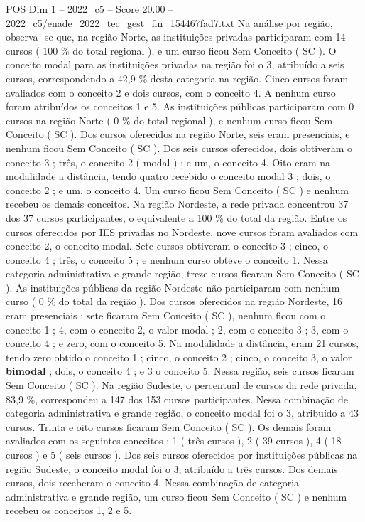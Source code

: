 \begin{textsample}{POS Dim 1 – 2022\_c5 – Score 20.00 – 2022\_c5/enade\_2022\_tec\_gest\_fin\_154467fad7.txt}
Na análise por região, observa -se que, na região Norte, as instituições privadas participaram com 14 cursos ( 100 \% do total regional ), e um curso ficou Sem Conceito ( SC ).
O conceito modal para as instituições privadas na região foi o 3, atribuído a seis cursos, correspondendo a 42,9 \% desta categoria na região.
Cinco cursos foram avaliados com o conceito 2 e dois cursos, com o conceito 4.
A nenhum curso foram atribuídos os conceitos 1 e 5.
As instituições públicas participaram com 0 cursos na região Norte ( 0 \% do total regional ), e nenhum curso ficou Sem Conceito ( SC ).
Dos cursos oferecidos na região Norte, seis eram presenciais, e nenhum ficou Sem Conceito ( SC ).
Dos seis cursos oferecidos, dois obtiveram o conceito 3 ; três, o conceito 2 ( modal ) ; e um, o conceito 4.
Oito eram na modalidade a distância, tendo quatro recebido o conceito modal 3 ; dois, o conceito 2 ; e um, o conceito 4.
Um curso ficou Sem Conceito ( SC ) e nenhum recebeu os demais conceitos.
Na região Nordeste, a rede privada concentrou 37 dos 37 cursos participantes, o equivalente a 100 \% do total da região.
Entre os cursos oferecidos por IES privadas no Nordeste, nove cursos foram avaliados com conceito 2, o conceito modal.
Sete cursos obtiveram o conceito 3 ; cinco, o conceito 4 ; três, o conceito 5 ; e nenhum curso obteve o conceito 1.
Nessa categoria administrativa e grande região, treze cursos ficaram Sem Conceito ( SC ).
As instituições públicas da região Nordeste não participaram com nenhum curso ( 0 \% do total da região ).
Dos cursos oferecidos na região Nordeste, 16 eram presenciais : sete ficaram Sem Conceito ( SC ), nenhum ficou com o conceito 1 ; 4, com o conceito 2, o valor modal ; 2, com o conceito 3 ; 3, com o conceito 4 ; e zero, com o conceito 5.
Na modalidade a distância, eram 21 cursos, tendo zero obtido o conceito 1 ; cinco, o conceito 2 ; cinco, o conceito 3, o valor \textbf{bimodal} ; dois, o conceito 4 ; e 3 o conceito 5.
Nessa região, seis cursos ficaram Sem Conceito ( SC ).
Na região Sudeste, o percentual de cursos da rede privada, 83,9 \%, correspondeu a 147 dos 153 cursos participantes.
Nessa combinação de categoria administrativa e grande região, o conceito modal foi o 3, atribuído a 43 cursos.
Trinta e oito cursos ficaram Sem Conceito ( SC ).
Os demais foram avaliados com os seguintes conceitos : 1 ( três cursos ), 2 ( 39 cursos ), 4 ( 18 cursos ) e 5 ( seis cursos ).
Dos seis cursos oferecidos por instituições públicas na região Sudeste, o conceito modal foi o 3, atribuído a três cursos.
Dos demais cursos, dois receberam o conceito 4.
Nessa combinação de categoria administrativa e grande região, um curso ficou Sem Conceito ( SC ) e nenhum recebeu os conceitos 1, 2 e 5.

\end{textsample}
